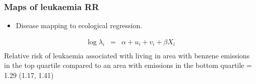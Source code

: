 \documentclass[slidestop,compress,serif,10pt]{beamer}
\begin{document}
\begin{frame}[t]
\frametitle{Maps of leukaemia RR}
\begin{itemize}\item Disease mapping to ecological regression. \end{itemize}
\begin{eqnarray*}
\log \lambda_{i} & = & \alpha + u_i + v_i + \beta X_i\\
\end{eqnarray*}
Relative risk of leukaemia associated with living in area with
benzene emissions in the top quartile compared to an area with
emissions in the bottom quartile = 1.29 (1.17, 1.41)
\begin{center}
\end{center}

\vspace{10pt}\fontsize{7}{7}
\end{frame}
\end{document}
